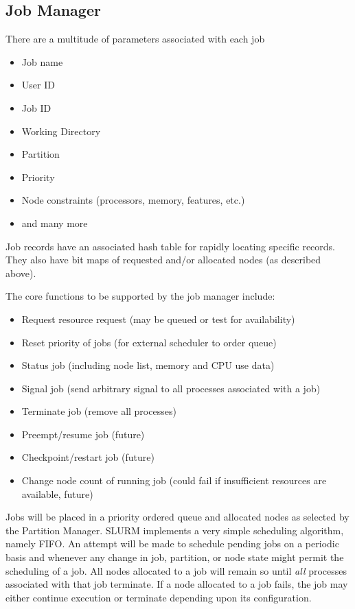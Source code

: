 \subsection{Job Manager}

There are a multitude of parameters associated with each job
\begin{itemize}
\item Job name
\item User ID
\item Job ID
\item Working Directory
\item Partition
\item Priority
\item Node constraints (processors, memory, features, etc.)
\item and many more
\end{itemize}

Job records have an associated hash table for rapidly locating 
specific records. They also have bit maps of requested and/or 
allocated nodes (as described above).

The core functions to be supported by the job manager include:
\begin{itemize}
\item Request resource request (may be queued or test for availability)
\item Reset priority of jobs (for external scheduler to order queue)
\item Status job (including node list, memory and CPU use data)
\item Signal job (send arbitrary signal to all processes associated with a job)
\item Terminate job (remove all processes)
\item Preempt/resume job  (future)
\item Checkpoint/restart job (future)
\item Change node count of running job (could fail if insufficient resources are 
available, future)
\end{itemize}

Jobs will be placed in a priority ordered queue and allocated nodes as 
selected by the Partition Manager. 
SLURM implements a very simple scheduling algorithm, namely FIFO. 
An attempt will be made to schedule pending jobs on a periodic basis
and whenever any change in job, partition, or node state might permit
the scheduling of a job.  All nodes allocated to a job will remain so
until {\em all} processes associated with that job terminate.  If a
node allocated to a job fails, the job may either continue execution or
terminate depending upon its configuration.

